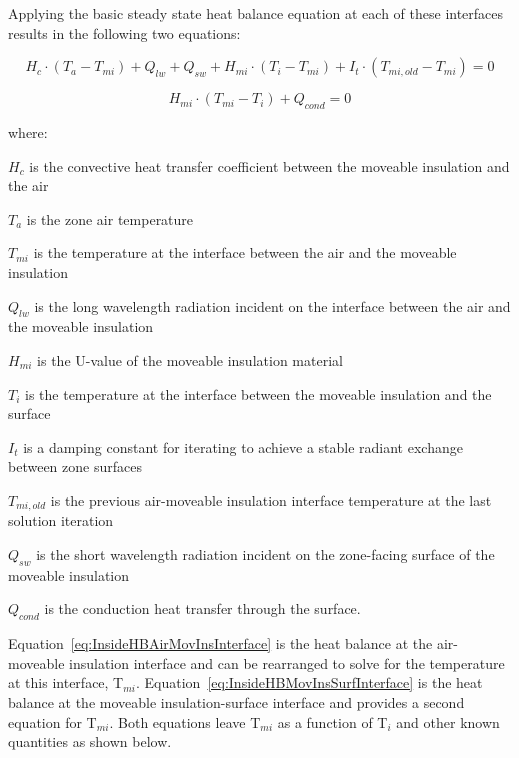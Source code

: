 Applying the basic steady state heat balance equation at each of these interfaces results in the following two equations:

\begin{equation}
H_c \cdot \left( T_a - T_{mi} \right) + Q_{lw} + Q_{sw} + H_{mi} \cdot \left( T_i - T_{mi} \right) + I_t \cdot \left( T_{mi,old} - T_{mi} \right) = 0
\label{eq:InsideHBAirMovInsInterface}
\end{equation}

\begin{equation}
H_{mi} \cdot \left( T_{mi} - T_i \right) + Q_{cond} = 0
\label{eq:InsideHBMovInsSurfInterface}
\end{equation}

where:

\(H_c\) is the convective heat transfer coefficient between the moveable insulation and the air

\(T_a\) is the zone air temperature

\(T_{mi}\) is the temperature at the interface between the air and the moveable insulation

\(Q_{lw}\) is the long wavelength radiation incident on the interface between the air and the moveable insulation

\(H_{mi}\) is the U-value of the moveable insulation material

\(T_i\) is the temperature at the interface between the moveable insulation and the surface

\(I_t\) is a damping constant for iterating to achieve a stable radiant exchange between zone surfaces

\(T_{mi,old}\) is the previous air-moveable insulation interface temperature at the last solution iteration

\(Q_{sw}\) is the short wavelength radiation incident on the zone-facing surface of the moveable insulation

\(Q_{cond}\) is the conduction heat transfer through the surface.

Equation~\ref{eq:InsideHBAirMovInsInterface} is the heat balance at the air-moveable insulation interface and can be rearranged to solve for the temperature at this interface, T\(_{mi}\).  Equation~\ref{eq:InsideHBMovInsSurfInterface} is the heat balance at the moveable insulation-surface interface and provides a second equation for T\(_{mi}\).  Both equations leave T\(_{mi}\) as a function of T\(_{i}\) and other known quantities as shown below.

